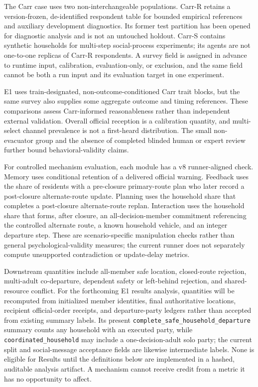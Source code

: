 \documentclass[journal]{IEEEtran}
\begin{document}
The Carr case uses two non-interchangeable populations. Carr-R retains a
version-frozen, de-identified respondent table for bounded empirical references
and auxiliary development diagnostics. Its former test partition has been
opened for diagnostic analysis and is not an untouched holdout. Carr-S contains
synthetic households for multi-step social-process
experiments; its agents are not one-to-one replicas of Carr-R respondents. A
survey field is assigned in advance to runtime input, calibration,
evaluation-only, or exclusion, and the same field cannot be both a run input and
its evaluation target in one experiment.

E1 uses train-designated, non-outcome-conditioned Carr trait blocks, but the
same survey also supplies some aggregate outcome and timing references. These
comparisons assess Carr-informed reasonableness rather than independent external
validation. Overall official reception is a calibration quantity, and
multi-select channel prevalence is not a first-heard distribution. The small
non-evacuator group and the absence of completed blinded human or expert review
further bound behavioral-validity claims.

For controlled mechanism evaluation, each module has a v8 runner-aligned check.
Memory uses conditional retention of a delivered official warning. Feedback
uses the share of residents with a pre-closure primary-route plan who later
record a post-closure alternate-route update. Planning uses the household share
that completes a post-closure alternate-route replan. Interaction uses the
household share that forms, after closure, an all-decision-member commitment
referencing the controlled alternate route, a known household vehicle, and an
integer departure step. These are scenario-specific manipulation checks rather
than general psychological-validity measures; the current runner does not
separately compute unsupported contradiction or update-delay metrics.

Downstream quantities include all-member safe location, closed-route rejection,
multi-adult co-departure, dependent safety or left-behind rejection, and shared-
resource conflict. For the forthcoming E1 results analysis, quantities will be
recomputed from initialized member identities, final authoritative locations,
recipient official-order receipts, and departure-party ledgers rather than
accepted from existing summary labels. Its present
\texttt{complete\_safe\_household\_departure} summary counts any household with
an executed party, while \texttt{coordinated\_household} may include a
one-decision-adult solo party; the current split and social-message acceptance
fields are likewise intermediate labels. None is eligible for Results until the
definitions below are implemented in a hashed, auditable analysis artifact. A
mechanism cannot receive credit from a metric it has no opportunity to affect.
\end{document}
